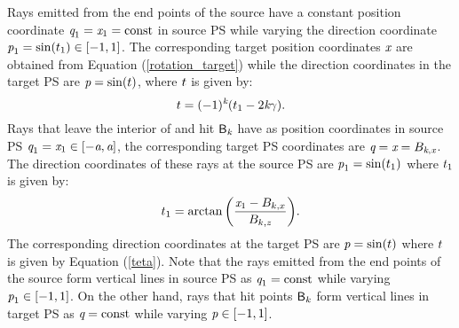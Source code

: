 Rays emitted from the end points of the source have a constant position coordinate $\textit{q}_1 = \textit{x}_1 = \textrm{const}$ in source PS while varying the direction coordinate $\textit{p}_1 = \sin(t_1)\in[-1, 1]$. The corresponding target position coordinates $\textit{x}$ are obtained from Equation (\ref{rotation_target}) while the direction coordinates in the target PS are $\textit{p} = \sin(t)$, where $t$ is given by: 
\begin{equation}\label{teta}
t=(-1)^{\textit{k}}(t_1-2\textit{k}\gamma).
\end{equation}
Rays that leave the interior of  and hit $\textsf{B}_{\textit{k}}$ have as position coordinates in source PS $\textit{q}_1 = \textit{x}_1\in[-\textit{a}, \textit{a}]$, the corresponding target PS coordinates are $\textit{q} = \textit{x} = B_{\textit{k}, \textit{x}}$.
The direction coordinates of these rays at the source PS are $\textit{p}_1 = \sin(t_1)$ where $t_1$ is given by:
\begin{equation}\label{anglesource}
t_1 = \arctan\bigg(\frac{\textit{x}_1-B_{k,x}}{B_{k,z}}\bigg).
\end{equation}
The corresponding direction coordinates at the target PS are $\textit{p}=\sin(t)$ where $t$ is given by Equation (\ref{teta}).
Note that the rays emitted from the end points of the source form vertical lines in source PS as $\textit{q}_1= \textrm{const}$ while varying $\textit{p}_1\in[-1,1]$.
On the other hand, rays that hit points $\textsf{B}_k$ form vertical lines in target PS  as $\textit{q} = \textrm{const}$ while varying $\textit{p}\in[-1,1]$.
\\ \indent 
